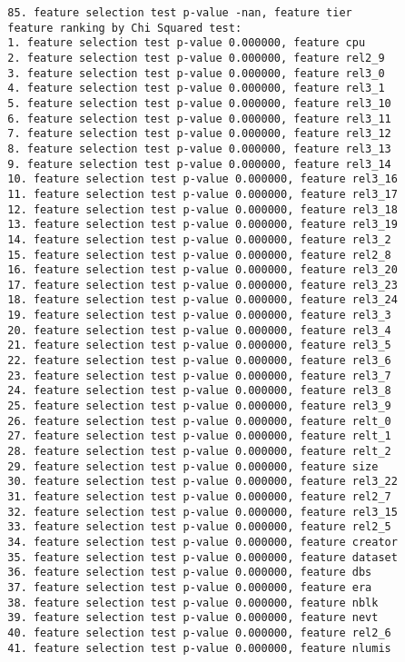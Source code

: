 \begin{verbatim}
  85. feature selection test p-value -nan, feature tier
  feature ranking by Chi Squared test:
  1. feature selection test p-value 0.000000, feature cpu
  2. feature selection test p-value 0.000000, feature rel2_9
  3. feature selection test p-value 0.000000, feature rel3_0
  4. feature selection test p-value 0.000000, feature rel3_1
  5. feature selection test p-value 0.000000, feature rel3_10
  6. feature selection test p-value 0.000000, feature rel3_11
  7. feature selection test p-value 0.000000, feature rel3_12
  8. feature selection test p-value 0.000000, feature rel3_13
  9. feature selection test p-value 0.000000, feature rel3_14
  10. feature selection test p-value 0.000000, feature rel3_16
  11. feature selection test p-value 0.000000, feature rel3_17
  12. feature selection test p-value 0.000000, feature rel3_18
  13. feature selection test p-value 0.000000, feature rel3_19
  14. feature selection test p-value 0.000000, feature rel3_2
  15. feature selection test p-value 0.000000, feature rel2_8
  16. feature selection test p-value 0.000000, feature rel3_20
  17. feature selection test p-value 0.000000, feature rel3_23
  18. feature selection test p-value 0.000000, feature rel3_24
  19. feature selection test p-value 0.000000, feature rel3_3
  20. feature selection test p-value 0.000000, feature rel3_4
  21. feature selection test p-value 0.000000, feature rel3_5
  22. feature selection test p-value 0.000000, feature rel3_6
  23. feature selection test p-value 0.000000, feature rel3_7
  24. feature selection test p-value 0.000000, feature rel3_8
  25. feature selection test p-value 0.000000, feature rel3_9
  26. feature selection test p-value 0.000000, feature relt_0
  27. feature selection test p-value 0.000000, feature relt_1
  28. feature selection test p-value 0.000000, feature relt_2
  29. feature selection test p-value 0.000000, feature size
  30. feature selection test p-value 0.000000, feature rel3_22
  31. feature selection test p-value 0.000000, feature rel2_7
  32. feature selection test p-value 0.000000, feature rel3_15
  33. feature selection test p-value 0.000000, feature rel2_5
  34. feature selection test p-value 0.000000, feature creator
  35. feature selection test p-value 0.000000, feature dataset
  36. feature selection test p-value 0.000000, feature dbs
  37. feature selection test p-value 0.000000, feature era
  38. feature selection test p-value 0.000000, feature nblk
  39. feature selection test p-value 0.000000, feature nevt
  40. feature selection test p-value 0.000000, feature rel2_6
  41. feature selection test p-value 0.000000, feature nlumis

\end{verbatim}
